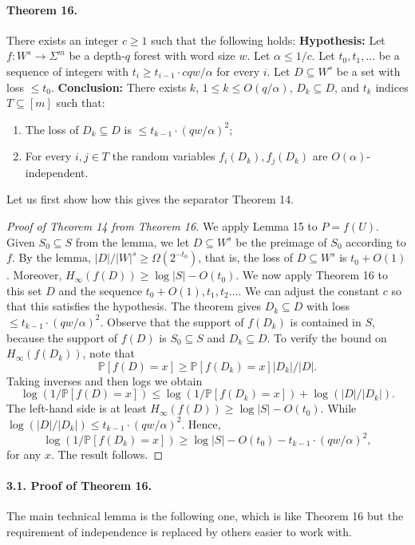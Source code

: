 \paragraph{Theorem 16.}
There exists an integer $c\geq1$ such that the following holds:
\textbf{Hypothesis:} Let $f:W^s\to\Sigma^m$ be a depth-$q$ forest with word size $w$. Let $\alpha\leq1/c$. Let $t_0,t_1,\ldots$ be a sequence of integers with $t_i\geq t_{i-1}\cdot cqw/\alpha$ for every $i$. Let $D\subseteq W^s$ be a set with loss $\leq t_0$.
\textbf{Conclusion:} There exists $k$, $1\leq k\leq O(q/\alpha)$, $D_k\subseteq D$, and $t_k$ indices $T\subseteq[m]$ such that:
\begin{enumerate}
\item[(1)] The loss of $D_k\subseteq D$ is $\leq t_{k-1}\cdot(qw/\alpha)^2$;
\item[(2)] For every $i,j\in T$ the random variables $f_i(D_k),f_j(D_k)$ are $O(\alpha)$-independent.
\end{enumerate}
Let us first show how this gives the separator Theorem 14.
\begin{proof}[Proof of Theorem 14 from Theorem 16]
We apply Lemma 15 to $P=f(U)$. Given $S_0\subseteq S$ from the lemma, we let $D\subseteq W^s$ be the preimage of $S_0$ according to $f$. By the lemma, $|D|/|W|^s\geq\Omega(2^{-t_0})$, that is, the loss of $D\subseteq W^s$ is $t_0+O(1)$. Moreover, $H_\infty(f(D))\geq\log|S|-O(t_0)$.
We now apply Theorem 16 to this set $D$ and the sequence $t_0+O(1),t_1,t_2\ldots$. We can adjust the constant $c$ so that this satisfies the hypothesis. The theorem gives $D_k\subseteq D$ with loss $\leq t_{k-1}\cdot(qw/\alpha)^2$.
Observe that the support of $f(D_k)$ is contained in $S$, because the support of $f(D)$ is $S_0\subseteq S$ and $D_k\subseteq D$.
To verify the bound on $H_\infty(f(D_k))$, note that
\[\mathbb P[f(D)=x]\geq\mathbb P[f(D_k)=x]|D_k|/|D|.\]
Taking inverses and then logs we obtain
\[\log(1/\mathbb P[f(D)=x])\leq\log(1/\mathbb P[f(D_k)=x])+\log(|D|/|D_k|).\]
The left-hand side is at least $H_\infty(f(D))\geq\log|S|-O(t_0)$. While $\log(|D|/|D_k|)\leq t_{k-1}\cdot(qw/\alpha)^2$. Hence,
\[\log(1/\mathbb P[f(D_k)=x])\geq\log|S|-O(t_0)-t_{k-1}\cdot(qw/\alpha)^2,\]
for any $x$. The result follows.
\end{proof}
\paragraph{3.1. Proof of Theorem 16.}
The main technical lemma is the following one, which is like Theorem 16 but the requirement of independence is replaced by others easier to work with.
